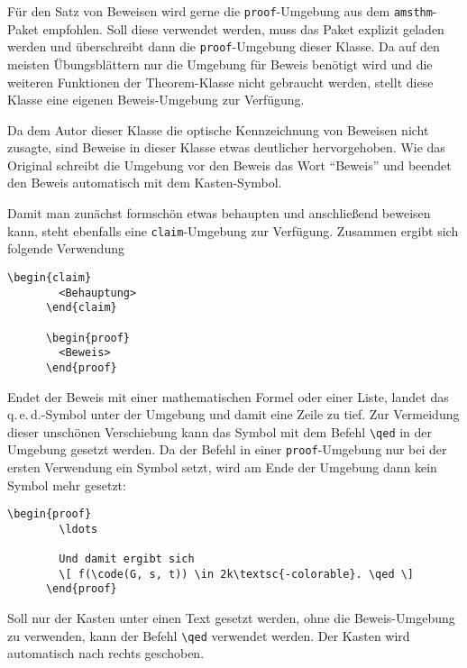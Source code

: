 \documentclass{exercise}
\begin{document}
    Für den Satz von Beweisen wird gerne die \lstinline{proof}-Umgebung aus dem \texttt{amsthm}-Paket \cite{amsthm} empfohlen. Soll diese verwendet werden, muss das Paket explizit geladen werden und überschreibt dann die \lstinline{proof}-Umgebung dieser Klasse. Da auf den meisten Übungsblättern nur die Umgebung für Beweis benötigt wird und die weiteren Funktionen der Theorem-Klasse nicht gebraucht werden, stellt diese Klasse eine eigenen Beweis-Umgebung zur Verfügung.

    Da dem Autor dieser Klasse die optische Kennzeichnung von Beweisen nicht zusagte, sind Beweise in dieser Klasse etwas deutlicher hervorgehoben. Wie das Original schreibt die Umgebung vor den Beweis das Wort \enquote{Beweis} und beendet den Beweis automatisch mit dem Kasten-Symbol.

    Damit man zunächst formschön etwas behaupten und anschließend beweisen kann, steht ebenfalls eine \lstinline{claim}-Umgebung zur Verfügung. Zusammen ergibt sich folgende Verwendung
    \begin{lstlisting}[gobble=6]
      \begin{claim}
        <Behauptung>
      \end{claim}

      \begin{proof}
        <Beweis>
      \end{proof}
    \end{lstlisting}

    Endet der Beweis mit einer mathematischen Formel oder einer Liste, landet das q.\,e.\,d.-Symbol unter der Umgebung und damit eine Zeile zu tief. Zur Vermeidung dieser unschönen Verschiebung kann das Symbol mit dem Befehl \lstinline-\qed- in der Umgebung gesetzt werden. Da der Befehl in einer \lstinline{proof}-Umgebung nur bei der ersten Verwendung ein Symbol setzt, wird am Ende der Umgebung dann kein Symbol mehr gesetzt:
    \begin{lstlisting}[gobble=6]
      \begin{proof}
        \ldots

        Und damit ergibt sich
        \[ f(\code(G, s, t)) \in 2k\textsc{-colorable}. \qed \]
      \end{proof}
    \end{lstlisting}

  Soll nur der Kasten unter einen Text gesetzt werden, ohne die Beweis-Umgebung zu verwenden, kann der Befehl \lstinline-\qed- verwendet werden. Der Kasten wird automatisch nach rechts geschoben.
\end{document}
